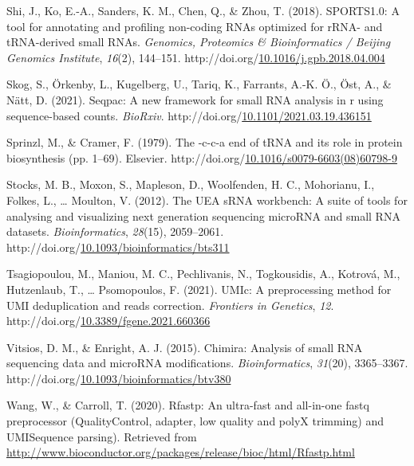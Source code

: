 \documentclass[12pt,twoside]{reedthesis}
\newlength{\cslhangindent}
\newenvironment{CSLReferences}[2] %
 {%
  \setlength{\parindent}{0pt}
  \ifodd #1 \everypar{\setlength{\hangindent}{\cslhangindent}}\ignorespaces\fi
  \ifnum #2 > 0
  \setlength{\parskip}{#2\baselineskip}
  \fi
 }%
 {}
\begin{document}
\begin{CSLReferences}{1}{0}
\leavevmode{}%
Shi, J., Ko, E.-A., Sanders, K. M., Chen, Q., \& Zhou, T. (2018). SPORTS1.0: A tool for annotating and profiling non-coding RNAs optimized for rRNA- and tRNA-derived small RNAs. \emph{Genomics, Proteomics \& Bioinformatics / Beijing Genomics Institute}, \emph{16}(2), 144--151. http://doi.org/\href{https://doi.org/10.1016/j.gpb.2018.04.004}{10.1016/j.gpb.2018.04.004}

\leavevmode{}%
Skog, S., Örkenby, L., Kugelberg, U., Tariq, K., Farrants, A.-K. Ö., Öst, A., \& Nätt, D. (2021). Seqpac: A new framework for small RNA analysis in r using sequence-based counts. \emph{BioRxiv}. http://doi.org/\href{https://doi.org/10.1101/2021.03.19.436151}{10.1101/2021.03.19.436151}

\leavevmode{}%
Sprinzl, M., \& Cramer, F. (1979). The -c-c-a end of tRNA and its role in protein biosynthesis (pp. 1--69). Elsevier. http://doi.org/\href{https://doi.org/10.1016/s0079-6603(08)60798-9}{10.1016/s0079-6603(08)60798-9}

\leavevmode{}%
Stocks, M. B., Moxon, S., Mapleson, D., Woolfenden, H. C., Mohorianu, I., Folkes, L., \ldots{} Moulton, V. (2012). The UEA sRNA workbench: A suite of tools for analysing and visualizing next generation sequencing microRNA and small RNA datasets. \emph{Bioinformatics}, \emph{28}(15), 2059--2061. http://doi.org/\href{https://doi.org/10.1093/bioinformatics/bts311}{10.1093/bioinformatics/bts311}

\leavevmode{}%
Tsagiopoulou, M., Maniou, M. C., Pechlivanis, N., Togkousidis, A., Kotrová, M., Hutzenlaub, T., \ldots{} Psomopoulos, F. (2021). UMIc: A preprocessing method for UMI deduplication and reads correction. \emph{Frontiers in Genetics}, \emph{12}. http://doi.org/\href{https://doi.org/10.3389/fgene.2021.660366}{10.3389/fgene.2021.660366}

\leavevmode{}%
Vitsios, D. M., \& Enright, A. J. (2015). Chimira: Analysis of small RNA sequencing data and microRNA modifications. \emph{Bioinformatics}, \emph{31}(20), 3365--3367. http://doi.org/\href{https://doi.org/10.1093/bioinformatics/btv380}{10.1093/bioinformatics/btv380}

\leavevmode{}%
Wang, W., \& Carroll, T. (2020). Rfastp: An ultra-fast and all-in-one fastq preprocessor (QualityControl, adapter, low quality and polyX trimming) and UMISequence parsing). Retrieved from \url{http://www.bioconductor.org/packages/release/bioc/html/Rfastp.html}


\end{CSLReferences}
\end{document}
